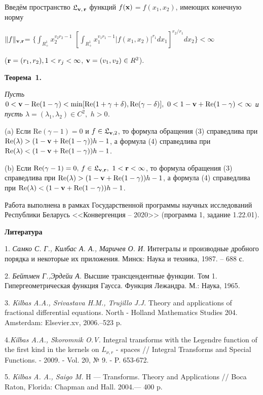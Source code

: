 Введём пространство  $\mathfrak{L}_{{\bf v},\,{\bf r}}$ функций
$f({\bf{x}})$$=f(x_{1},x_{2})$, имеющих конечную норму

\noindent$ \|f\|_{\bf{v},\bf{r}}$=
 $ \{\int_{R_{+}^{1}}x_{2}^{v_{2}r_{2}-1}$
$[\int_{R_{+}^{1}}x_{1}^{v_{1}r_{1}-1}
|f(x_{1},x_{2})|^{r_{1}}dx_{1}]^{r_{2}/r_{1}}dx_{2}\} <\infty$

 \noindent(${\bf r}=(r_{1},r_{2}), 1<{ r_{j}}<\infty$,
 ${\bf v}=(v_{1},v_{2})\in { R}^{2}$).


 \textbf{Теорема~1.} {\it Пусть
$0<{\bf
v}-\mathrm{Re}(1-\gamma)<\min[\mathrm{Re}(1+\gamma+\delta),\mathrm{Re}(\gamma-\delta)],\,\,
0<1-{\bf v}+\mathrm{Re}(1-\gamma)<\infty$ и пусть $\lambda =
(\lambda_{1},\lambda_{2})\in C^{2},\,\,h>0$.

(a) Если $\mathrm{Re}(\gamma-1)=0$ и $f\in\mathfrak{L}_{{\bf v},2}$,
то формула обращения (3)  справедлива  при
$\mathrm{Re}(\lambda)>(1-{\bf v}+\mathrm{Re}(1-\gamma))h-1$, а
формула (4) справедлива при $\mathrm{Re}(\lambda)<(1-{\bf
v}+\mathrm{Re}(1-\gamma))h-1$.

(b) Если $\mathrm{Re}(\gamma-1)=0,\,f\in\mathfrak{L}_{{\bf v},{\bf
r}},\,\,1<{\bf r}<\infty$, то формула обращения  (3) справедлива при
$\mathrm{Re}(\lambda)>(1-{\bf v}+\mathrm{Re}(1-\gamma))h-1$, а
формула (4) справедлива при $\mathrm{Re}(\lambda)<(1-{\bf
v}+\mathrm{Re}(1-\gamma))h-1$.}

Работа выполнена в рамках Государственной программы научных
исследований Республики Беларусь <<Конвергенция -- 2020>> (программа
1, задание 1.22.01).

\smallskip \centerline{\bf Литература}\nopagebreak


1. {\it Самко С. Г., Килбас А. А., Маричев О. И.} Интегралы и
производные дробного порядка и некоторые их приложения. Минск: Наука
и техника, 1987. -- 688 с.

2. {\it  Бейтмен Г.,Эрдейи А.}  Высшие трансцендентные функции. Том
1. Гипергеометрическая функция Гаусса. Функция Лежандра. М.: Наука,
1965.

3. {\it Kilbas A.A., Srivastava H.M., Trujillo J.J.} Theory and
applications of fractional differential equations. North - Holland
Mathematics Studies 204. Amsterdam: Elsevier.xv, 2006.--523 p.

4.{\it Kilbas A.A., Skoromnik O.V.} Integral transforms with the
Legendre function of the first kind in the kernels on $L_{\nu,r}$ -
spaces // Integral Transforms and Special Functions. - 2009. - Vol.
20, № 9. - P. 653-672.

5. {\it  Kilbas A. A., Saigo M.} H — Transforms. Theory and
Applications // Boca Raton, Florida: Chapman and Hall. 2004.— 400 p.


